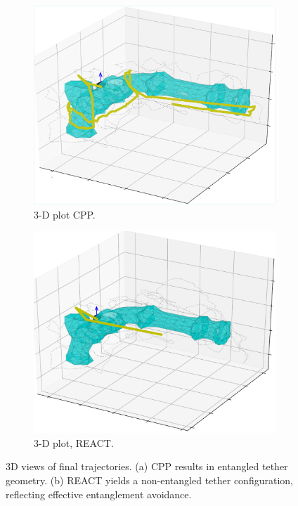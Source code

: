 \begin{figure}[ht]
    \centering
    \begin{subfigure}[b]{0.48\linewidth}
        \centering
        \includegraphics[width=\linewidth]{EA-Planner/figures/fc_planner_final_view.pdf}
        \caption{3-D plot CPP.}
        \label{fig:3d_cpp}
    \end{subfigure}
    \hfill
    \begin{subfigure}[b]{0.48\linewidth}
        \centering
        \includegraphics[width=\linewidth]{EA-Planner/figures/react_pipe.pdf}
        \caption{3-D plot, \ac{REACT}.}
        \label{fig:3d_oea}
    \end{subfigure}
    \caption{3D views of final trajectories. (a) CPP results in entangled tether geometry. (b) \ac{REACT} yields a non-entangled tether configuration, reflecting effective entanglement avoidance.}
    \label{fig:3Dplots}
\end{figure}
